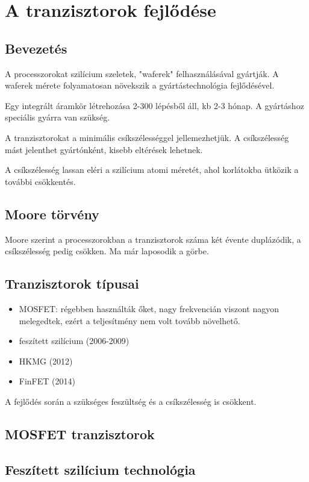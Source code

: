 
\chapter{A tranzisztorok fejlődése}

\section{Bevezetés}
A processzorokat szilícium szeletek, "waferek" felhasználásával gyártják.
A waferek mérete folyamatosan növekszik a gyártástechnológia fejlődésével.

Egy integrált áramkör létrehozása 2-300 lépésből áll, kb 2-3 hónap.
A gyártáshoz speciális gyárra van szükség.

A tranzisztorokat a minimális csíkszélességgel jellemezhetjük.
A csíkszélesség mást jelenthet gyártónként, kisebb eltérések lehetnek.

A csíkszélesség lassan eléri a szilícium atomi méretét, ahol korlátokba ütközik a további csökkentés.

\section{Moore törvény}
Moore szerint a processzorokban a tranzisztorok száma két évente duplázódik, a csíkszélesség pedig csökken.
Ma már laposodik a görbe.

\section{Tranzisztorok típusai}
\begin{itemize}
    \item MOSFET: régebben használták őket, nagy frekvencián viszont nagyon melegedtek, ezért a teljesítmény nem volt tovább növelhető.
    \item feszített szilícium (2006-2009)
    \item HKMG (2012)
    \item FinFET (2014)
\end{itemize}
A fejlődés során a szükséges feszültség és a csíkszélesség is csökkent.

\section{MOSFET tranzisztorok}

\section{Feszített szilícium technológia}

